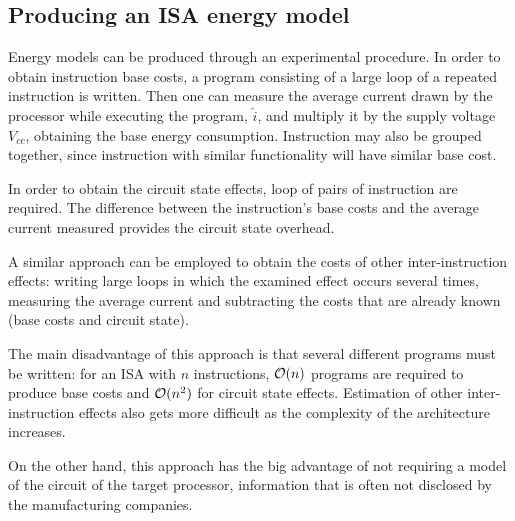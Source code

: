 \subsection{Producing an ISA energy model}
Energy models can be produced through an experimental procedure. \newline
In order to obtain instruction base costs, a program consisting of a large loop of a repeated instruction is written. Then one can measure the average current drawn by the processor while executing the program, $\hat{i}$, and multiply it by the supply voltage $V_{cc}$, obtaining the base energy consumption. \newline
Instruction may also be grouped together, since instruction with similar functionality will have similar base cost.\par 
In order to obtain the circuit state effects, loop of pairs of instruction are required. The difference between the instruction's base costs and the average current measured provides the circuit state overhead. \par 
A similar approach can be employed to obtain the costs of other inter-instruction effects: writing large loops in which the examined effect occurs several times, measuring the average current and subtracting the costs that are already known (base costs and circuit state). \par 
The main disadvantage of this approach is that several different programs must be written: for an ISA with $n$ instructions, $\mathcal{O}(n)$ programs are required to produce base costs and $\mathcal{O}(n^{2})$ for circuit state effects. \newline
Estimation of other inter-instruction effects also gets more difficult as the complexity of the architecture increases. \par
On the other hand, this approach has the big advantage of not requiring a model of the circuit of the target processor, information that is often not disclosed by the manufacturing companies.
